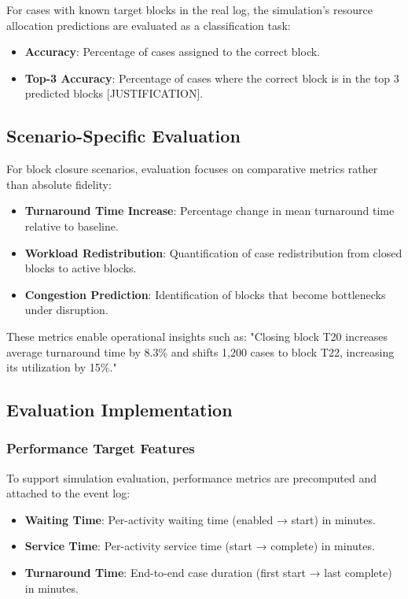         For cases with known target blocks in the real log, the simulation's resource allocation predictions are evaluated as a classification task:
        
        \begin{itemize}
            \item \textbf{Accuracy}: Percentage of cases assigned to the correct block.
            \item \textbf{Top-3 Accuracy}: Percentage of cases where the correct block is in the top 3 predicted blocks [JUSTIFICATION].
        \end{itemize}

    \subsection{Scenario-Specific Evaluation}
    
    For block closure scenarios, evaluation focuses on comparative metrics rather than absolute fidelity:
    
    \begin{itemize}
        \item \textbf{Turnaround Time Increase}: Percentage change in mean turnaround time relative to baseline.
        \item \textbf{Workload Redistribution}: Quantification of case redistribution from closed blocks to active blocks.
        \item \textbf{Congestion Prediction}: Identification of blocks that become bottlenecks under disruption.
    \end{itemize}
    
    These metrics enable operational insights such as: "Closing block T20 increases average turnaround time by 8.3\% and shifts 1,200 cases to block T22, increasing its utilization by 15\%."

\subsection{Evaluation Implementation}
        
        \subsubsection{Performance Target Features}
    
        To support simulation evaluation, performance metrics are precomputed and attached to the event log:
        
        \begin{itemize}
            \item \textbf{Waiting Time}: Per-activity waiting time (enabled → start) in minutes.
            \item \textbf{Service Time}: Per-activity service time (start → complete) in minutes.
            \item \textbf{Turnaround Time}: End-to-end case duration (first start → last complete) in minutes.
        \end{itemize}
        
